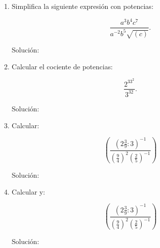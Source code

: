 \documentclass[11pt,letterpaper]{article}
\begin{document}
\begin{enumerate}

	\item Simplifica la siguiente expresión con potencias:

	\begin{equation}
		\frac{a^3b^4c^7}{a^{-2}b^5\sqrt{(c)}}.
	\end{equation}

	Solución:

	\item Calcular el cociente de potencias:

	\begin{equation}
		\frac{2^33^2}{3^32}.
	\end{equation}

	Solución:
	
	\item Calcular:

	\begin{equation}
		\left( \frac{\left( 2 \frac{3}{9} : 3\right)^{-1}}{\left(\frac{9}{4}\right)^2\left(\frac{2}{5}\right)^{-1}} \right)
	\end{equation}

	Solución:

	\item Calcular y:

	\begin{equation}
		\left( \frac{\left( 2 \frac{3}{9} : 3\right)^{-1}}{\left(\frac{9}{4}\right)^2\left(\frac{2}{5}\right)^{-1}} \right)
	\end{equation}

	Solución:

\end{enumerate}
\end{document}
